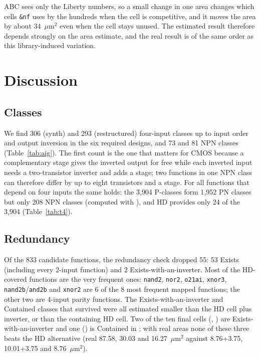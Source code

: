 \documentclass[10pt,a4paper]{article}
\newcommand{\um}{\ensuremath{\mu\mathrm{m}^2}}
\newcommand{\file}[1]{\texttt{\detokenize{#1}}}
\newcommand{\cell}[1]{\texttt{\detokenize{#1}}}
\begin{document}
ABC sees only the Liberty numbers, so a small change in one area changes which cells \texttt{\&nf} uses by
the hundreds when the cell is competitive, and it moves the area by about 34~\um{} even when the cell stays
unused. The estimated result therefore depends strongly on the area estimate, and the real result is of the
same order as this library-induced variation.

\section{Discussion}
\label{sec:disc}

\subsection{Classes}
We find 306 (synth) and 293 (restructured) four-input classes up to input order and output inversion in
the six required designs, and 73 and 81 NPN classes (Table~\ref{tab:aig}). The first count is the one
that matters for CMOS because a complementary stage gives the inverted output for free while each inverted
input needs a two-transistor inverter and adds a stage; two functions in one NPN class can therefore differ by
up to eight transistors and a stage. For all functions that depend on four inputs the same holds: the 3{,}904 P-classes form 1{,}952 PN
classes but only 208 NPN classes (computed with \file{dd2/boolfn.py}), and HD provides only 24 of the
3{,}904 (Table~\ref{tab:t4}).

\subsection{Redundancy}
Of the 833 candidate functions, the redundancy check dropped 55: 53 Exists (including every 2-input function)
and 2 Exists-with-an-inverter. Most of the HD-covered functions are the very frequent ones: \texttt{nand2},
\texttt{nor2}, \texttt{o21ai}, \texttt{xnor3}, \texttt{nand2b}/\texttt{and2b} and \texttt{xnor2} are 6 of the
8 most frequent mapped functions; the other two are 4-input parity functions. The Exists-with-an-inverter and Contained classes that survived were all
estimated smaller than the HD cell plus inverter, or than the containing HD cell. Two of the ten final cells
(\cell{n4_88f8}, \cell{n3_2e}) are Exists-with-an-inverter and one (\cell{n4_07ff}) is Contained in
\cell{a32oi_1}; with real areas none of these three beats the HD alternative (real 87.58, 30.03 and 16.27~\um{}
against 8.76+3.75, 10.01+3.75 and 8.76~\um).
\end{document}
